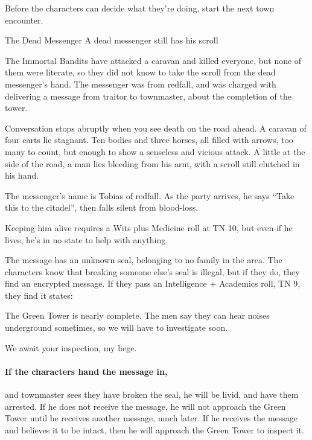 \begin{multicols}{2}
Before the characters can decide what they're doing, start the next town encounter.

{The Dead Messenger}%
{A dead messenger still has his scroll}%

The Immortal Bandits have attacked a caravan and killed everyone, but none of them were literate, so they did not know to take the scroll from the dead messenger's hand.
The messenger was from \gls{redfall}, and was charged with delivering a message from \gls{traitor} to \gls{townmaster}, about the completion of the tower.

\begin{boxtext}

	Conversation stops abruptly when you see death on the road ahead.
	A caravan of four carts lie stagnant.
	Ten bodies and three horses, all filled with arrows, too many to count, but enough to show a senseless and vicious attack.
	A little at the side of the road, a man lies bleeding from his arm, with a scroll still clutched in his hand.

\end{boxtext}

The messenger's name is Tobias of \gls{redfall}.
As the party arrives, he says ``Take this to the citadel'', then falls silent from blood-loss.

Keeping him alive requires a Wits plus Medicine roll at TN 10, but even if he lives, he's in no state to help with anything.

The message has an unknown seal, belonging to no family in the area.
The characters know that breaking someone else's seal is illegal, but if they do, they find an encrypted message.
If they pass an Intelligence + Academics roll, TN 9, they find it states:

\begin{speechtext}

	The Green Tower is nearly complete.
	The men say they can hear noises underground sometimes, so we will have to investigate soon.

	We await your inspection, my liege.

\end{speechtext}

\paragraph{If the characters hand the message in,}
and \gls{townmaster} sees they have broken the seal, he will be livid, and have them arrested.
If he does not receive the message, he will not approach the Green Tower until he receives another message, much later.
If he receives the message and believes it to be intact, then he will approach the Green Tower to inspect it.


\end{multicols}
